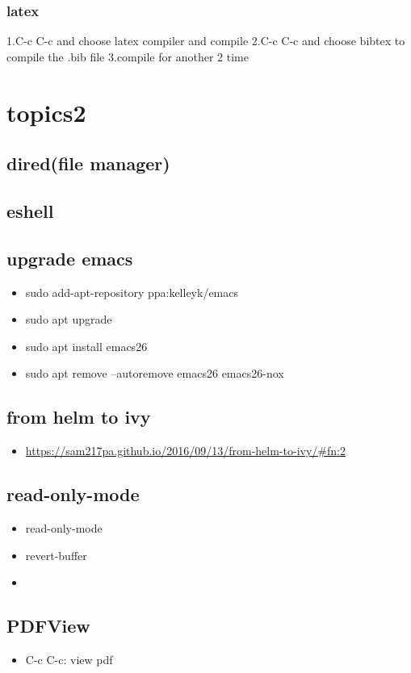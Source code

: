 \documentclass[11pt]{article}
\begin{document}
\subsubsection{latex}
\label{sec:org1c2ead3}
1.C-c C-c and choose latex compiler and compile
2.C-c C-c and choose bibtex to compile the .bib file
3.compile for another 2 time
\section{topics2}
\label{sec:orgf6320a9}
\subsection{dired(file manager)}
\label{sec:orga80bc2a}
\subsection{eshell}
\label{sec:org3b743d7}
\subsection{upgrade emacs}
\label{sec:org319776d}
\begin{itemize}
\item sudo add-apt-repository ppa:kelleyk/emacs
\item sudo apt upgrade
\item sudo apt install emacs26
\item sudo apt remove --autoremove emacs26 emacs26-nox
\end{itemize}
\subsection{from helm to ivy}
\label{sec:org4b20588}
\begin{itemize}
\item \url{https://sam217pa.github.io/2016/09/13/from-helm-to-ivy/\#fn:2}
\end{itemize}
\subsection{read-only-mode}
\label{sec:orgb306f1d}
\begin{itemize}
\item read-only-mode
\item revert-buffer
\item 
\end{itemize}
\subsection{PDFView}
\label{sec:org6d85955}
\begin{itemize}
\item C-c C-c: view pdf
\end{itemize}
\end{document}
